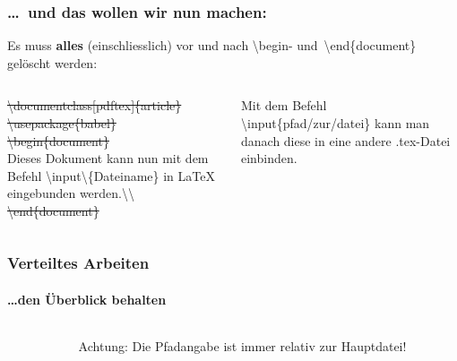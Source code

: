 \begin{frame}
\frametitle{\ldots ~und das wollen wir nun machen:}
Es muss \textbf{alles} (einschliesslich) vor und nach \color{unibablueI}\textbackslash begin\color{black}- 
und\color{unibablueI}~\textbackslash end\color{black}\{document\} gel\"oscht werden:\\[5mm]
\begin{columns}
\begin{column}{.47\textwidth}
\sout{\color{nounibaredI}\color{nounibaredI}\textbackslash documentclass\color{black}\color{nounibagreenI}[pdftex]\color{black}\{article\} \\
\color{nounibaredI}\textbackslash usepackage\color{black}\{babel\}\\
\color{nounibaredI}\color{unibablueI}\textbackslash\color{unibablueI}begin\color{black}\color{black}\{document\} }\\
Dieses Dokument kann nun mit dem Befehl \color{nounibaredI}\color{nounibaredI}\textbackslash input\color{nounibaredI}\textbackslash \color{black}\{Dateiname\} in LaTeX eingebunden werden.\color{nounibaredI}\color{nounibaredI}\textbackslash \color{nounibaredI}\textbackslash \color{black}  \\
\sout{\color{nounibaredI}\color{unibablueI}\textbackslash\color{unibablueI}end\color{black}\color{black}\{document\} }
\end{column}
\begin{column}{.47\textwidth}
Mit dem Befehl \color{nounibaredI}\textbackslash input\color{black}\{pfad/zur/datei\} kann man danach
 diese in eine andere {\ttfamily .tex}-Datei einbinden. 

\end{column}
\end{columns}
\end{frame}

\begin{frame}
\frametitle{Verteiltes Arbeiten}
\framesubtitle{\ldots den \"Uberblick behalten}
\begin{columns}{2}
\begin{column}{.6\textwidth}
\end{column}
\begin{column}{.3\textwidth}
\begin{alertblock}{Achtung:}
Die Pfadangabe ist immer relativ zur Hauptdatei!
\end{alertblock}
\end{column}
\end{columns}

\end{frame}


